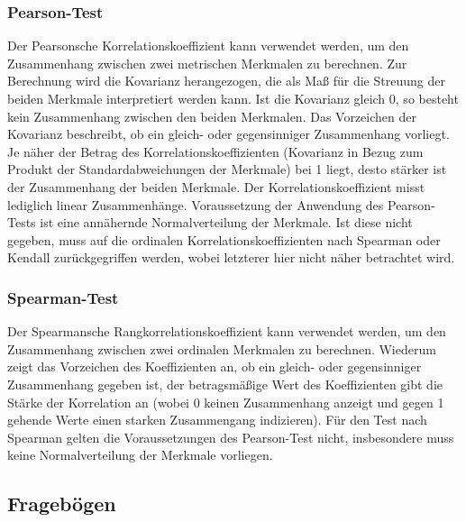 \subsubsection{Pearson-Test} %
\label{ssub:pearson_test}

Der Pearsonsche Korrelationskoeffizient kann verwendet werden, um den Zusammenhang zwischen zwei metrischen Merkmalen zu berechnen. Zur Berechnung wird die Kovarianz herangezogen, die als Maß für die Streuung der beiden Merkmale interpretiert werden kann. Ist die Kovarianz gleich 0, so besteht kein Zusammenhang zwischen den beiden Merkmalen. Das Vorzeichen der Kovarianz beschreibt, ob ein gleich- oder gegensinniger Zusammenhang vorliegt. Je näher der Betrag des Korrelationskoeffizienten (Kovarianz in Bezug zum Produkt der Standardabweichungen der Merkmale) bei 1 liegt, desto stärker ist der Zusammenhang der beiden Merkmale. Der Korrelationskoeffizient misst lediglich linear Zusammenhänge. Voraussetzung der Anwendung des Pearson-Tests ist eine annähernde Normalverteilung der Merkmale. Ist diese nicht gegeben, muss auf die ordinalen Korrelationskoeffizienten nach Spearman oder Kendall zurückgegriffen werden, wobei letzterer hier nicht näher betrachtet wird. \citep{Duller08}


\subsubsection{Spearman-Test} %
\label{ssub:spearman_test}

Der Spearmansche Rangkorrelationskoeffizient kann verwendet werden, um den Zusammenhang zwischen zwei ordinalen Merkmalen zu berechnen. Wiederum zeigt das Vorzeichen des Koeffizienten an, ob ein gleich- oder gegensinniger Zusammenhang gegeben ist, der betragsmäßige Wert des Koeffizienten gibt die Stärke der Korrelation an (wobei 0 keinen Zusammenhang anzeigt und gegen 1 gehende Werte einen starken Zusammengang indizieren). Für den Test nach Spearman gelten die Voraussetzungen des Pearson-Test nicht, insbesondere muss keine Normalverteilung der Merkmale vorliegen.



\subsection{Fragebögen} %
\label{sub:fragebögen}

